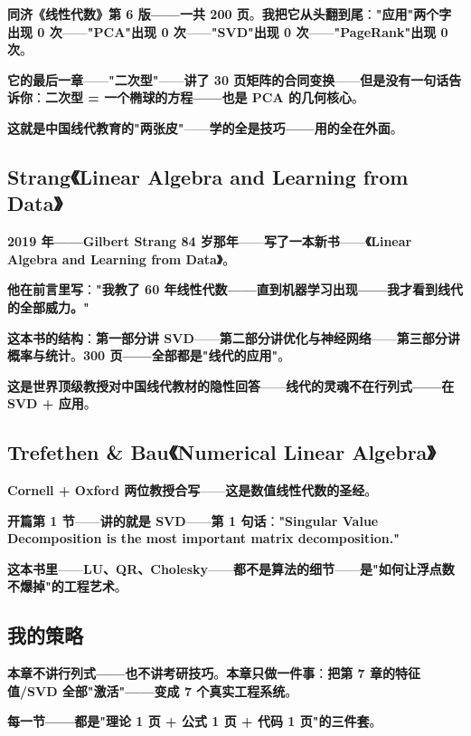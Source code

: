 \textbf{同济《线性代数》第 6 版——一共 200 页}。\textbf{我把它从头翻到尾}：\textbf{"应用"两个字出现 0 次}——\textbf{"PCA"出现 0 次}——\textbf{"SVD"出现 0 次}——\textbf{"PageRank"出现 0 次}。

\textbf{它的最后一章}——\textbf{"二次型"}——\textbf{讲了 30 页矩阵的合同变换}——\textbf{但是没有一句话告诉你}：\textbf{二次型 = 一个椭球的方程——也是 PCA 的几何核心}。

\textbf{这就是中国线代教育的"两张皮"}——\textbf{学的全是技巧——用的全在外面}。

\subsection{Strang《Linear Algebra and Learning from Data》}

\textbf{2019 年——Gilbert Strang 84 岁那年}——\textbf{写了一本新书}——\textbf{《Linear Algebra and Learning from Data》}。

\textbf{他在前言里写}：\textbf{"我教了 60 年线性代数——直到机器学习出现——我才看到线代的全部威力。"}

\textbf{这本书的结构}：\textbf{第一部分讲 SVD}——\textbf{第二部分讲优化与神经网络}——\textbf{第三部分讲概率与统计}。\textbf{300 页——全部都是"线代的应用"}。

\textbf{这是世界顶级教授对中国线代教材的隐性回答}——\textbf{线代的灵魂不在行列式——在 SVD + 应用}。

\subsection{Trefethen \& Bau《Numerical Linear Algebra》}

\textbf{Cornell + Oxford 两位教授合写}——\textbf{这是数值线性代数的圣经}。

\textbf{开篇第 1 节}——\textbf{讲的就是 SVD}——\textbf{第 1 句话}：\textbf{"Singular Value Decomposition is the most important matrix decomposition."}

\textbf{这本书里}——\textbf{LU、QR、Cholesky}——\textbf{都不是\textbf{算法的细节}}——\textbf{是\textbf{"如何让浮点数不爆掉"的工程艺术}}。

\subsection{我的策略}

\textbf{本章不讲行列式——也不讲考研技巧}。\textbf{本章只做一件事}：\textbf{把第 7 章的特征值/SVD 全部"激活"——变成 7 个真实工程系统}。

\textbf{每一节——都是\textbf{"理论 1 页 + 公式 1 页 + 代码 1 页"}的三件套}。

